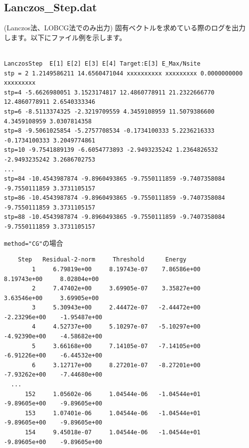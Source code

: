 \newpage
\subsection{Lanczos\_Step.dat}
(Lanczos法、LOBCG法でのみ出力) 固有ベクトルを求めている際のログを出力します。以下にファイル例を示します。\\

\hspace{-2cm}
\\
\hspace{-2cm}
\begin{minipage}{19cm}
  \small
\begin{screen}
\begin{verbatim}
LanczosStep  E[1] E[2] E[3] E[4] Target:E[3] E_Max/Nsite
stp = 2 1.2149586211 14.6560471044 xxxxxxxxxx xxxxxxxxx 0.0000000000 xxxxxxxxx
stp=4 -5.6626980051 3.1523174817 12.4860778911 21.2322666770 12.4860778911 2.6540333346
stp=6 -8.5113374325 -2.3219709559 4.3459108959 11.5079386600 4.3459108959 3.0307814358
stp=8 -9.5061025854 -5.2757708534 -0.1734100333 5.2236216333 -0.1734100333 3.2049774861
stp=10 -9.7541889139 -6.6054773893 -2.9493235242 1.2364826532 -2.9493235242 3.2686702753
...
stp=84 -10.4543987874 -9.8960493865 -9.7550111859 -9.7407358084 -9.7550111859 3.3731105157
stp=86 -10.4543987874 -9.8960493865 -9.7550111859 -9.7407358084 -9.7550111859 3.3731105157
stp=88 -10.4543987874 -9.8960493865 -9.7550111859 -9.7407358084 -9.7550111859 3.3731105157
\end{verbatim}
\end{screen}
\normalsize
\end{minipage}

\hspace{-2cm}
\verb|method="CG"|の場合
\\
\hspace{-2cm}
\begin{minipage}{19cm}
    \small
\begin{screen}
\begin{verbatim}
    Step   Residual-2-norm     Threshold      Energy
        1     6.79819e+00     8.19743e-07    7.86586e+00     8.19743e+00     8.02804e+00
        2     7.47402e+00     3.69905e-07    3.35827e+00     3.63546e+00     3.69905e+00
        3     5.30943e+00     2.44472e-07   -2.44472e+00    -2.23296e+00    -1.95487e+00
        4     4.52737e+00     5.10297e-07   -5.10297e+00    -4.92390e+00    -4.58682e+00
        5     3.66168e+00     7.14105e-07   -7.14105e+00    -6.91226e+00    -6.44532e+00
        6     3.12717e+00     8.27201e-07   -8.27201e+00    -7.93262e+00    -7.44680e+00
  ...
      152     1.05602e-06     1.04544e-06   -1.04544e+01    -9.89605e+00    -9.89605e+00
      153     1.07401e-06     1.04544e-06   -1.04544e+01    -9.89605e+00    -9.89605e+00
      154     9.45018e-07     1.04544e-06   -1.04544e+01    -9.89605e+00    -9.89605e+00
\end{verbatim}
\end{screen}
\normalsize
\end{minipage}

